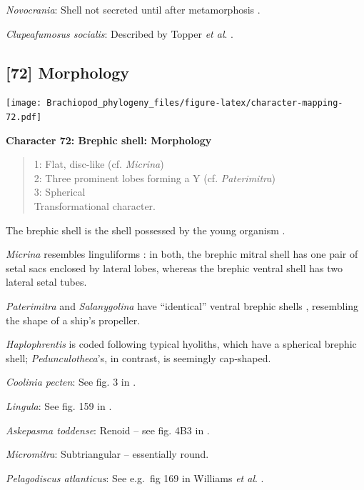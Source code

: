\documentclass[]{book}
\theoremstyle{definition}
\theoremstyle{definition}
\theoremstyle{definition}
\theoremstyle{remark}
\begin{document}
\emph{Novocrania}: Shell not secreted until after metamorphosis
\citep{Popov2010Earliestontogeny}.

\emph{Clupeafumosus socialis}: Described by Topper \emph{et al}.
\citeyearpar{Topper2013Reappraisalof}.

\hypertarget{morphology}{%
\subsection*{{[}72{]} Morphology}\label{morphology}}

\texttt{[image: Brachiopod\_phylogeny\_files/figure-latex/character-mapping-72.pdf]}

\textbf{Character 72: Brephic shell: Morphology}

\begin{quote}
1: Flat, disc-like (cf. \emph{Micrina})\\
2: Three prominent lobes forming a Y (cf. \emph{Paterimitra})\\
3: Spherical\\
Transformational character.
\end{quote}

The brephic shell is the shell possessed by the young organism
\citep[see][ and references therein for discussion of
terminology]{Ushatinskaya2016Revisionof}.

\emph{Micrina} resembles linguliforms \citep{Holmer2011Firstrecord}: in
both, the brephic mitral shell has one pair of setal sacs enclosed by
lateral lobes, whereas the brephic ventral shell has two lateral setal
tubes.

\emph{Paterimitra} and \emph{Salanygolina} have ``identical'' ventral
brephic shells \citep{Holmer2011Firstrecord}, resembling the shape of a
ship's propeller.

\emph{Haplophrentis} is coded following typical hyoliths, which have a
spherical brephic shell; \emph{Pedunculotheca}'s, in contrast, is
seemingly cap-shaped.

\emph{Coolinia pecten}: See fig. 3 in
\citet{Bassett2017Earliestontogeny}.

\emph{Lingula}: See fig. 159 in \citet{Williams1997BrachiopodaRevised}.

\emph{Askepasma toddense}: Renoid -- see fig. 4B3 in
\citet{Topper2013Theoldest}.

\emph{Micromitra}: Subtriangular -- essentially round.

\emph{Pelagodiscus atlanticus}: See e.g.~fig 169 in Williams \emph{et
al}. \citeyearpar{Williams1997BrachiopodaRevised}.
\end{document}
